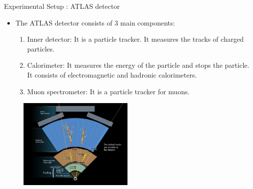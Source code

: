 \documentclass[mathserif,serif]{beamer}
\begin{document}
\begin{frame}{Experimental Setup : ATLAS detector}
\begin{itemize}
\item The ATLAS detector consists of 3 main components:
\begin{enumerate}
\item Inner detector: It is a particle tracker. It measures the tracks of charged particles.
\item Calorimeter: It measures the energy of the particle and stops the particle. It consists of electromagnetic and hadronic calorimeters.
\item Muon spectrometer:  It is a particle tracker for muons.
\end{enumerate}
\end{itemize}
\begin{figure}
\centering
\includegraphics[width=0.5\textwidth]{data/photo/detector/ATLAS_particles.jpg}
\end{figure}
\end{frame}
\end{document}
